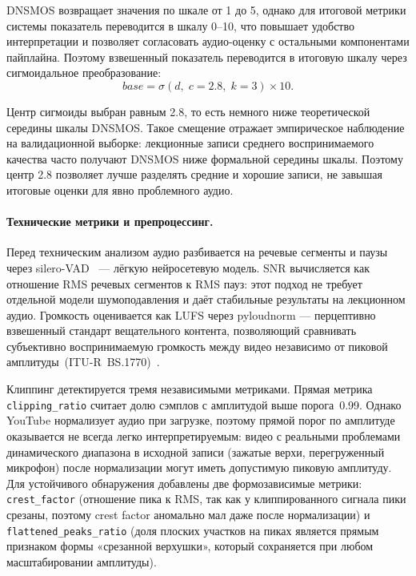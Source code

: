 DNSMOS возвращает значения по шкале от 1 до 5, однако для итоговой метрики системы показатель переводится в шкалу 0--10,
что повышает удобство интерпретации и позволяет согласовать аудио-оценку с остальными компонентами пайплайна.
Поэтому взвешенный показатель переводится в итоговую шкалу через сигмоидальное преобразование:
\begin{equation}
\textit{base} = \sigma(d,\; c{=}2.8,\; k{=}3) \times 10.
\end{equation}

Центр сигмоиды выбран равным 2.8, то есть немного ниже теоретической середины шкалы DNSMOS.
Такое смещение отражает эмпирическое наблюдение на валидационной выборке: лекционные записи среднего воспринимаемого качества часто получают DNSMOS ниже формальной середины шкалы.
Поэтому центр 2.8 позволяет лучше разделять средние и хорошие записи, не завышая итоговые оценки для явно проблемного аудио.

\paragraph{Технические метрики и препроцессинг.}

Перед техническим анализом аудио разбивается на речевые сегменты и паузы
через silero-VAD~\cite{silero2021vad} — лёгкую нейросетевую модель.
SNR вычисляется как отношение RMS речевых сегментов к RMS пауз:
этот подход не требует отдельной модели шумоподавления и даёт
стабильные результаты на лекционном аудио.
Громкость оценивается как LUFS через pyloudnorm —
 перцептивно взвешенный стандарт вещательного контента, позволяющий сравнивать субъективно воспринимаемую громкость между видео независимо
 от пиковой амплитуды~(ITU-R~BS.1770)~\cite{itu2023bs1770,pyloudnorm}.

Клиппинг детектируется тремя независимыми метриками.
Прямая метрика \texttt{clipping\_ratio} считает долю сэмплов
с амплитудой выше порога~0.99. Однако YouTube нормализует аудио при загрузке,
поэтому прямой порог по амплитуде оказывается не всегда легко интерпретируемым:
видео с реальными проблемами динамического диапазона в исходной записи
(зажатые верхи, перегруженный микрофон) после нормализации
могут иметь допустимую пиковую амплитуду.
Для устойчивого обнаружения добавлены две формозависимые метрики:
\texttt{crest\_factor} (отношение пика к RMS, так как у клиппированного сигнала
пики срезаны, поэтому crest factor аномально мал даже после нормализации)
и \texttt{flattened\_peaks\_ratio} (доля плоских участков на пиках является прямым признаком
формы «срезанной верхушки», который сохраняется при любом масштабировании амплитуды).

